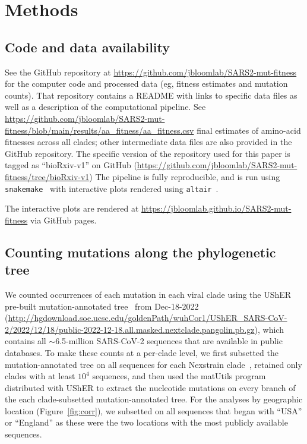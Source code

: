 \documentclass[9pt,twocolumn,twoside]{gsajnl_modified}
\begin{document}
{\small

\section{Methods}
\subsection{Code and data availability}
See the GitHub repository at \url{https://github.com/jbloomlab/SARS2-mut-fitness} for the computer code and processed data (eg, fitness estimates and mutation counts).
That repository contains a README with links to specific data files as well as a description of the computational pipeline.
See \url{https://github.com/jbloomlab/SARS2-mut-fitness/blob/main/results/aa_fitness/aa_fitness.csv} final estimates of amino-acid fitnesses across all clades; other intermediate data files are also provided in the GitHub repository.
The specific version of the repository used for this paper is tagged as ``bioRxiv-v1'' on GitHub (\url{https://github.com/jbloomlab/SARS2-mut-fitness/tree/bioRxiv-v1})
The pipeline is fully reproducible, and is run using \texttt{snakemake}~\citep{molder2021sustainable} with interactive plots rendered using \texttt{altair}~\citep{vanderplas2018altair}.

The interactive plots are rendered at \url{https://jbloomlab.github.io/SARS2-mut-fitness} via GitHub pages.

\subsection{Counting mutations along the phylogenetic tree}
We counted occurrences of each mutation in each viral clade using the UShER pre-built mutation-annotated tree~\citep{mcbroome2021daily,turakhia2021ultrafast,lanfear2020} from Dec-18-2022 (\url{http://hgdownload.soe.ucsc.edu/goldenPath/wuhCor1/UShER_SARS-CoV-2/2022/12/18/public-2022-12-18.all.masked.nextclade.pangolin.pb.gz}), which contains all $\sim$6.5-million SARS-CoV-2 sequences that are available in public databases.
To make these counts at a per-clade level, we first subsetted the mutation-annotated tree on all sequences for each Nexstrain clade~\citep{aksamentov2021nextclade}, retained only clades with at least $10^4$ sequences, and then used the matUtils program distributed with UShER to extract the nucleotide mutations on every branch of the each clade-subsetted mutation-annotated tree.
For the analyses by geographic location (Figure~\ref{fig:corr}), we subsetted on all sequences that began with ``USA'' or ``England'' as these were the two locations with the most publicly available sequences.

}
\end{document}
